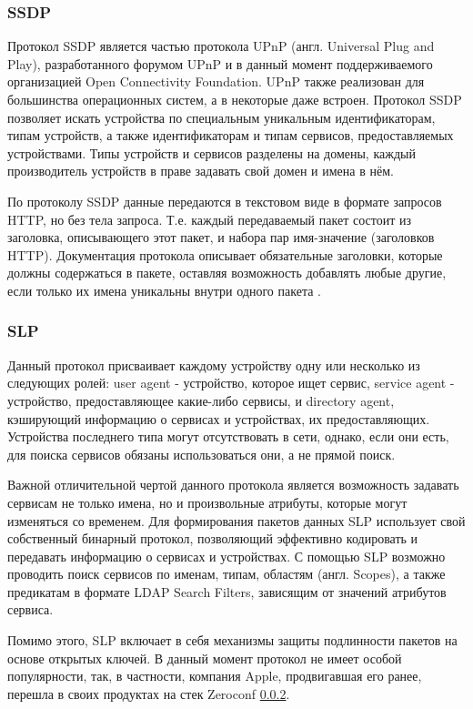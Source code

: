 \subsubsection{SSDP}
Протокол SSDP является частью протокола UPnP (англ.
Universal Plug and Play), разработанного форумом UPnP и в данный момент поддерживаемого организацией Open Connectivity Foundation.
UPnP также реализован для большинства операционных систем, а в некоторые даже встроен.
Протокол SSDP позволяет искать устройства по специальным уникальным идентификаторам, типам устройств, а также идентификаторам и типам сервисов, предоставляемых устройствами.
Типы устройств и сервисов разделены на домены, каждый производитель устройств в праве задавать свой домен и имена в нём.

По протоколу SSDP данные передаются в текстовом виде в формате запросов HTTP, но без тела запроса.
Т.е. каждый передаваемый пакет состоит из заголовка, описывающего этот пакет, и набора пар имя-значение (заголовков HTTP).
Документация протокола описывает обязательные заголовки, которые должны содержаться в пакете, оставляя возможность добавлять любые другие, если только их имена уникальны внутри одного пакета \cite{ref15}.

\subsubsection{SLP}
Данный протокол присваивает каждому устройству одну или несколько из следующих ролей: user agent - устройство, которое ищет сервис, service agent - устройство, предоставляющее какие-либо сервисы, и directory agent, кэширующий информацию о сервисах и устройствах, их предоставляющих.
Устройства последнего типа могут отсутствовать в сети, однако, если они есть, для поиска сервисов обязаны использоваться они, а не прямой поиск.

Важной отличительной чертой данного протокола является возможность задавать сервисам не только имена, но и произвольные атрибуты, которые могут изменяться со временем.
Для формирования пакетов данных SLP использует свой собственный бинарный протокол, позволяющий эффективно кодировать и передавать информацию о сервисах и устройствах.
С помощью SLP возможно проводить поиск сервисов по именам, типам, областям (англ. Scopes), а также предикатам в формате LDAP Search Filters, зависящим от значений атрибутов сервиса.

Помимо этого, SLP включает в себя механизмы защиты подлинности пакетов на основе открытых ключей. 
В данный момент протокол не имеет особой популярности, так, в частности, компания Apple, продвигавшая его ранее, перешла в своих продуктах на стек Zeroconf \ref{}.

